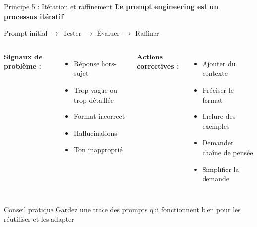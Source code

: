 \begin{frame}{Principe 5 : Itération et raffinement}
\textbf{Le prompt engineering est un processus itératif}

\vspace{0.3cm}

\begin{center}
Prompt initial $\rightarrow$ Tester $\rightarrow$ Évaluer $\rightarrow$ Raffiner
\end{center}

\vspace{0.3cm}

\begin{columns}
\textbf{Signaux de problème :}
\begin{itemize}
    \item Réponse hors-sujet
    \item Trop vague ou trop détaillée
    \item Format incorrect
    \item Hallucinations
    \item Ton inapproprié
\end{itemize}

\textbf{Actions correctives :}
\begin{itemize}
    \item Ajouter du contexte
    \item Préciser le format
    \item Inclure des exemples
    \item Demander chaîne de pensée
    \item Simplifier la demande
\end{itemize}
\end{columns}

\vspace{0.3cm}

\begin{exampleblock}{Conseil pratique}
Gardez une trace des prompts qui fonctionnent bien pour les réutiliser et les adapter
\end{exampleblock}
\end{frame}

